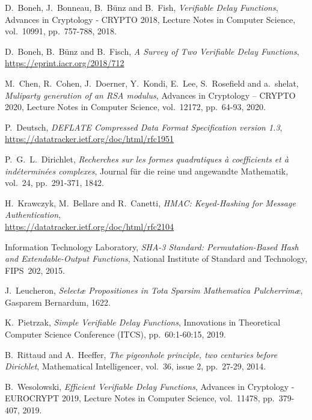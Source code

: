 \documentclass{llncs}
\begin{document}
\begin{thebibliography}{20}

\RaggedRight

D.~Boneh, J.~Bonneau, B.~Bünz and B.~Fish,
\emph{Verifiable Delay Functions},
Advances in Cryptology - CRYPTO 2018, Lecture Notes in Computer Science,
vol.~10991, pp.~757-788, 2018.

D.~Boneh, B.~Bünz and B.~Fisch,
\emph{A Survey of Two Verifiable Delay Functions},\\
\url{https://eprint.iacr.org/2018/712}

M.~Chen, R.~Cohen, J.~Doerner, Y.~Kondi, E.~Lee, S.~Rosefield and a.~shelat,
\emph{Muliparty generation of an RSA modulus},
Advances in Cryptology – CRYPTO 2020, Lecture Notes in Computer Science,
vol.~12172, pp.~64-93, 2020.

P.~Deutsch,
\emph{DEFLATE Compressed Data Format Specification version 1.3},\\
\url{https://datatracker.ietf.org/doc/html/rfc1951}

P.~G.~L.~Dirichlet,
\emph{Recherches sur les formes quadratiques à coefficients et à
indéterminées complexes}, Journal für die reine und angewandte
Mathematik, vol.~24, pp.~291-371, 1842.

H.~Krawczyk, M.~Bellare and R.~Canetti,
\emph{HMAC: Keyed-Hashing for Message Authentication},\\
\url{https://datatracker.ietf.org/doc/html/rfc2104}

Information Technology Laboratory,
\emph{SHA-3 Standard: Permutation-Based Hash and Extendable-Output Functions},
National Institute of Standard and Technology, FIPS~202, 2015.

J.~Leucheron,
\emph{Selectæ Propositiones in Tota Sparsim Mathematica Pulcherrimæ},
Gasparem Bernardum, 1622.

K.~Pietrzak,
\emph{Simple Verifiable Delay Functions},
Innovations in Theoretical Computer Science Conference (ITCS),
pp.~60:1-60:15, 2019.

B.~Rittaud and A.~Heeffer,
\emph{The pigeonhole principle, two centuries before Dirichlet},
Mathematical Intelligencer, vol.~36, issue 2, pp.~27-29, 2014.

B.~Wesolowski,
\emph{Efficient Verifiable Delay Functions},
Advances in Cryptology - EUROCRYPT 2019, Lecture Notes in Computer Science,
vol.~11478, pp.~379-407, 2019.

\end{thebibliography}

\end{document}
